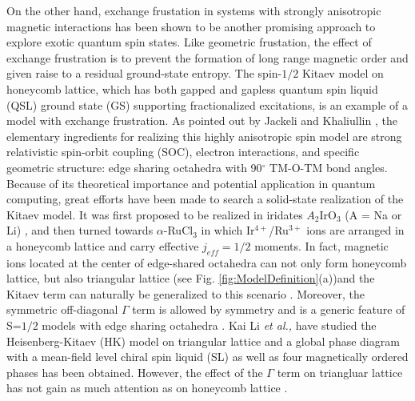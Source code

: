 \documentclass[aps,prb,reprint,groupedaddress,showpacs,amsfonts,amsmath,amssymb,superscriptaddress]{revtex4-1}
\begin{document}
On the other hand, exchange frustation in systems with strongly anisotropic magnetic interactions has been shown to be another promising approach to explore exotic quantum spin states. Like geometric frustation, the effect of exchange frustration is to prevent the formation of long range magnetic order and given raise to a residual ground-state entropy. The spin-$1/2$ Kitaev model \cite{Kitaev2006} on honeycomb lattice, which has both gapped and gapless quantum spin liquid (QSL) ground state (GS) supporting fractionalized excitations, is an example of a model with exchange frustration. As pointed out by Jackeli and Khaliullin \cite{Khaliullin2005, PhysRevLett.102.017205}, the elementary ingredients for realizing this highly anisotropic spin model are strong relativistic spin-orbit coupling (SOC), electron interactions, and specific geometric structure: edge sharing octahedra with 90$^\circ$ TM-O-TM bond angles. Because of its theoretical importance and potential application in quantum computing, great efforts have been made to search a solid-state realization of the Kitaev model. It was first proposed to be realized in iridates $A_2$IrO$_3$ (A = Na or Li) \cite{PhysRevLett.105.027204,PhysRevLett.108.127204,Chun2015,PhysRevLett.110.076402,PhysRevB.87.220407,PhysRevLett.110.097204,PhysRevLett.108.127203,PhysRevB.92.024413,PhysRevLett.112.077204,Rau2014}, and then turned towards $\alpha$-RuCl$_3$ \cite{PhysRevB.91.180401,Banerjee2016,PhysRevB.92.235119,PhysRevB.94.161106,PhysRevB.93.214431,PhysRevLett.118.107203,PhysRevLett.118.107203,PhysRevB.96.115103} in which Ir$^{4+}$/Ru$^{3+}$ ions are arranged in a honeycomb lattice and carry effective $j_{eff}=1/2$ moments. In fact, magnetic ions located at the center of edge-shared octahedra can not only form honeycomb lattice, but also triangular lattice (see Fig. \ref{fig:ModelDefinition}(a))and the Kitaev term can naturally be generalized to this scenario \cite{PhysRevB.93.104417,PhysRevB.89.014414}. Moreover, the symmetric off-diagonal $\Gamma$ term is allowed by symmetry and is a generic feature of S=$1/2$ models with edge sharing octahedra \cite {PhysRevLett.112.077204}. Kai Li \emph{et al.,} \cite{KaiLi2015} have studied the Heisenberg-Kitaev (HK) model on triangular lattice and a global phase diagram with a mean-field level chiral spin liquid (SL) as well as four magnetically ordered phases has been obtained. However, the effect of the $\Gamma$ term on triangluar lattice has not gain as much attention as on honeycomb lattice \cite{PhysRevLett.112.077204,Rau2014,PhysRevLett.118.107203,PhysRevB.96.115103,PhysRevB.93.214431,PhysRevB.100.144422}.
\end{document}
